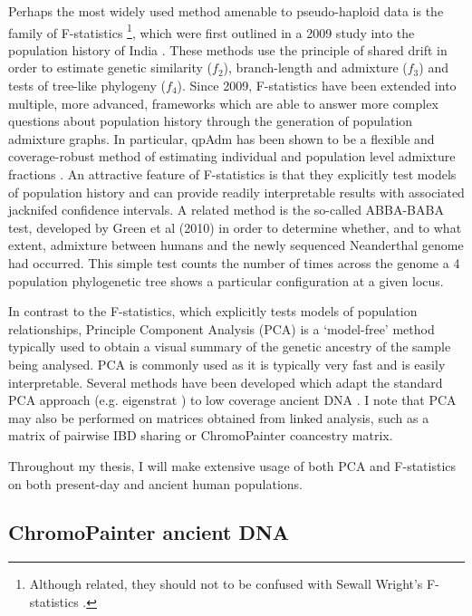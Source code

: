 Perhaps the most widely used method amenable to pseudo-haploid data is the family of F-statistics \footnote{Although related, they should not to be confused with Sewall Wright's F-statistics \cite{wright1949genetical}.}, which were first outlined in a 2009 study into the population history of India \cite{reich2009reconstructing}. These methods use the principle of shared drift in order to estimate genetic similarity ($f_{2}$), branch-length and admixture ($f_{3}$) and tests of tree-like phylogeny ($f_{4}$). Since 2009, F-statistics have been extended into multiple, more advanced, frameworks which are able to answer more complex questions about population history through the generation of population admixture graphs. In particular, qpAdm has been shown to be a flexible and coverage-robust method of estimating individual and population level admixture fractions \cite{AssessingqpAdm}. An attractive feature of F-statistics is that they explicitly test models of population history and can provide readily interpretable results with associated jacknifed confidence intervals. A related method is the so-called ABBA-BABA test, developed by Green et al (2010) \cite{Green2010} in order to determine whether, and to what extent, admixture between humans and the newly sequenced Neanderthal genome had occurred. This simple test counts the number of times across the genome a 4 population phylogenetic tree shows a particular configuration at a given locus. 

In contrast to the F-statistics, which explicitly tests models of population relationships, Principle Component Analysis (PCA) is a `model-free' method typically used to obtain a visual summary of the genetic ancestry of the sample being analysed. PCA is commonly used as it is typically very fast and is easily interpretable. Several methods have been developed which adapt the standard PCA approach (e.g. eigenstrat \cite{price2006principal}) to low coverage ancient DNA \cite{franccois2020factor, herrando2021smartsnp, AlbrechtsenPCAmissingness}. I note that PCA may also be performed on matrices obtained from linked analysis, such as a matrix of pairwise IBD sharing or ChromoPainter coancestry matrix. 

Throughout my thesis, I will make extensive usage of both PCA and F-statistics on both present-day and ancient human populations.


\subsection{ChromoPainter ancient DNA}

